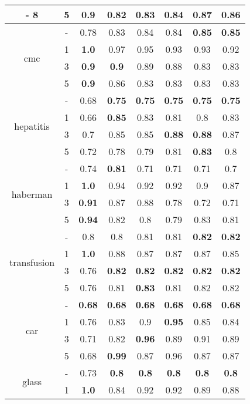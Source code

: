 \documentclass{article}%
\begin{document}
\begin{longtable}{c|c|cccccc}
{-%
8}%
&5&\textbf{0.9}&0.82&0.83&0.84&0.87&0.86\\%
\hline%
\multirow{4}{*}{cmc}&{-}&0.78&0.83&0.84&0.84&\textbf{0.85}&\textbf{0.85}\\%
\cline{2%
-%
8}%
&1&\textbf{1.0}&0.97&0.95&0.93&0.93&0.92\\%
\cline{2%
-%
8}%
&3&\textbf{0.9}&\textbf{0.9}&0.89&0.88&0.83&0.83\\%
\cline{2%
-%
8}%
&5&\textbf{0.9}&0.86&0.83&0.83&0.83&0.83\\%
\hline%
\multirow{4}{*}{hepatitis}&{-}&0.68&\textbf{0.75}&\textbf{0.75}&\textbf{0.75}&\textbf{0.75}&\textbf{0.75}\\%
\cline{2%
-%
8}%
&1&0.66&\textbf{0.85}&0.83&0.81&0.8&0.83\\%
\cline{2%
-%
8}%
&3&0.7&0.85&0.85&\textbf{0.88}&\textbf{0.88}&0.87\\%
\cline{2%
-%
8}%
&5&0.72&0.78&0.79&0.81&\textbf{0.83}&0.8\\%
\hline%
\multirow{4}{*}{haberman}&{-}&0.74&\textbf{0.81}&0.71&0.71&0.71&0.7\\%
\cline{2%
-%
8}%
&1&\textbf{1.0}&0.94&0.92&0.92&0.9&0.87\\%
\cline{2%
-%
8}%
&3&\textbf{0.91}&0.87&0.88&0.78&0.72&0.71\\%
\cline{2%
-%
8}%
&5&\textbf{0.94}&0.82&0.8&0.79&0.83&0.81\\%
\hline%
\multirow{4}{*}{transfusion}&{-}&0.8&0.8&0.81&0.81&\textbf{0.82}&\textbf{0.82}\\%
\cline{2%
-%
8}%
&1&\textbf{1.0}&0.88&0.87&0.87&0.87&0.85\\%
\cline{2%
-%
8}%
&3&0.76&\textbf{0.82}&\textbf{0.82}&\textbf{0.82}&\textbf{0.82}&\textbf{0.82}\\%
\cline{2%
-%
8}%
&5&0.76&0.81&\textbf{0.83}&0.81&0.82&0.82\\%
\hline%
\multirow{4}{*}{car}&{-}&\textbf{0.68}&\textbf{0.68}&\textbf{0.68}&\textbf{0.68}&\textbf{0.68}&\textbf{0.68}\\%
\cline{2%
-%
8}%
&1&0.76&0.83&0.9&\textbf{0.95}&0.85&0.84\\%
\cline{2%
-%
8}%
&3&0.71&0.82&\textbf{0.96}&0.89&0.91&0.89\\%
\cline{2%
-%
8}%
&5&0.68&\textbf{0.99}&0.87&0.96&0.87&0.87\\%
\hline%
\multirow{4}{*}{glass}&{-}&0.73&\textbf{0.8}&\textbf{0.8}&\textbf{0.8}&\textbf{0.8}&\textbf{0.8}\\%
\cline{2%
-%
8}%
&1&\textbf{1.0}&0.84&0.92&0.92&0.89&0.88\\%

\end{longtable}
\end{document}

